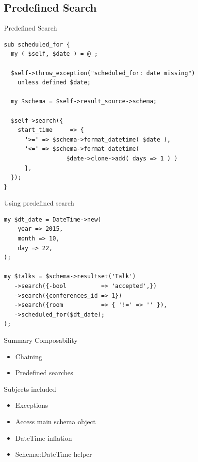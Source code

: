 \subsection{Predefined Search}
\begin{frame}[fragile]{Predefined Search}
\begin{lstlisting}
sub scheduled_for {
  my ( $self, $date ) = @_;

  $self->throw_exception("scheduled_for: date missing")
    unless defined $date;
    
  my $schema = $self->result_source->schema;

  $self->search({
    start_time     => {
      '>=' => $schema->format_datetime( $date ),
      '<=' => $schema->format_datetime( 
                  $date->clone->add( days => 1 ) )
      },
  });
}
\end{lstlisting}
\end{frame}


\begin{frame}[fragile]{Using predefined search}

\begin{lstlisting}
my $dt_date = DateTime->new(
    year => 2015,
    month => 10,
    day => 22,
);

my $talks = $schema->resultset('Talk')
   ->search({-bool          => 'accepted',})
   ->search({conferences_id => 1})
   ->search({room           => { '!=' => '' }),
   ->scheduled_for($dt_date);
);
\end{lstlisting}
\end{frame}

\begin{frame}[fragile]{Summary Composability}
\begin{itemize}
\item Chaining
\item Predefined searches
\end{itemize}
\end{frame}

\begin{frame}[fragile]{Subjects included}
\begin{itemize}
\item Exceptions
\item Access main schema object
\item DateTime inflation
\item Schema::DateTime helper
\end{itemize}
\end{frame}

